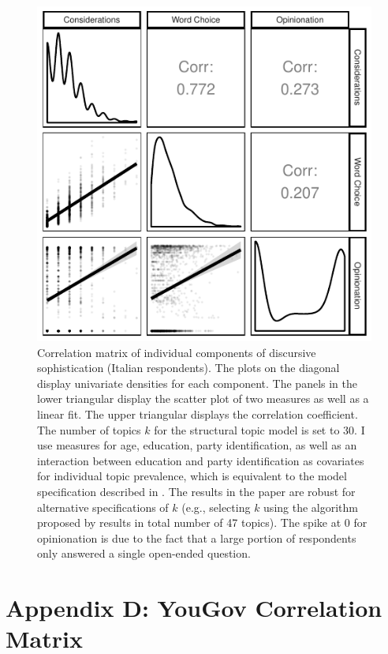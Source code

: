 \documentclass[12pt]{article}
\begin{document}
\begin{figure}[h]\centering
\includegraphics{../fig/swiss_corplot_italian_components.pdf}
\caption{Correlation matrix of individual components of discursive sophistication (Italian respondents). The plots on the diagonal display univariate densities for each component. The panels in the lower triangular display the scatter plot of two measures as well as a linear fit. The upper triangular displays the correlation coefficient. The number of topics $k$ for the structural topic model is set to 30. I use measures for age, education, party identification, as well as an interaction between education and party identification as covariates for individual topic prevalence, which is equivalent to the model specification described in \citet{roberts2014structural}. The results in the paper are robust for alternative specifications of $k$ (e.g., selecting $k$ using the algorithm proposed by \citet{lee2014low} results in total number of 47 topics). The spike at 0 for opinionation is due to the fact that a large portion of respondents only answered a single open-ended question.}\label{fig:swiss_italian_components}
\end{figure}


\clearpage
\section*{Appendix D: YouGov Correlation Matrix}
\renewcommand\thefigure{D.\arabic{figure}}
\renewcommand\thetable{D.\arabic{table}}
\setcounter{figure}{0}
\setcounter{table}{0}
\end{document}
